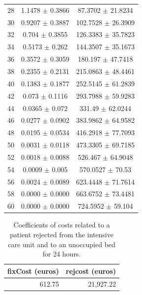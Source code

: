 \documentclass[12pt]{article}
\begin{document}
\begin{table}[H]
\begin{tabular}{ccc}
28 & 1.1478 $\pm$ 0.3866 & 87.3702 $\pm$ 21.8234 \\ 
30 & 0.9207 $\pm$ 0.3887 & 102.7528 $\pm$ 26.3909 \\
32 & 0.704 $\pm$ 0.3855 & 126.3383 $\pm$ 35.7823 \\
34 & 0.5173 $\pm$ 0.262 & 144.3507 $\pm$ 35.1673 \\
36 & 0.3572 $\pm$ 0.3059 & 180.197 $\pm$ 47.7418 \\
38 & 0.2355 $\pm$ 0.2131 & 215.0863 $\pm$ 48.4461 \\
40 & 0.1383 $\pm$ 0.1877 & 252.5145 $\pm$ 61.2839 \\
42 & 0.073 $\pm$ 0.1116 & 293.7988 $\pm$ 59.9283 \\
44 & 0.0365 $\pm$ 0.072 & 331.49 $\pm$ 62.0244 \\
46 & 0.0277 $\pm$ 0.0902 & 383.9862 $\pm$ 64.9582 \\
48 & 0.0195 $\pm$ 0.0534 & 416.2918 $\pm$ 77.7093 \\
50 & 0.0031 $\pm$ 0.0118 & 473.3305 $\pm$ 69.7185 \\
52 & 0.0018 $\pm$ 0.0088 & 526.467 $\pm$ 64.9048 \\
54 & 0.0009 $\pm$ 0.005 & 570.0527 $\pm$ 70.53 \\
56 & 0.0024 $\pm$ 0.0089 & 623.4448 $\pm$ 71.7614 \\
58 & 0.0000 $\pm$ 0.0000 & 663.6752 $\pm$ 73.4481 \\
60 & 0.0000 $\pm$ 0.0000 & 724.5952 $\pm$ 59.104 \\
\hline
\end{tabular}
\end{table}

\begin{table}[ht]
\captionsetup{skip=10pt}
\centering
\caption{Coefficients of costs related to a patient rejected from the intensive care unit and to an unoccupied bed for 24 hours.}
\label{tab:costAnalSimulation}
\begin{tabular}{rr}
\hline
fixCost (euros) & rejcost (euros) \\
\hline
612.75 & 21,927.22 \\
\hline
\end{tabular}
\end{table}
\end{document}
